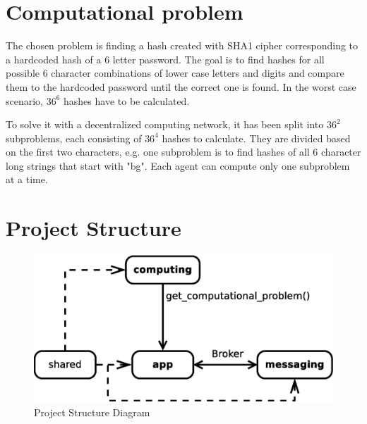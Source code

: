 \documentclass{article}
\begin{document}
\section{Computational problem}
The chosen problem is finding a hash created with SHA1 cipher corresponding to a hardcoded hash of a 6 letter password.
The goal is to find hashes for all possible 6 character combinations of lower case letters and digits and compare them to the hardcoded password until the correct one is found.
In the worst case scenario, $36^6$ hashes have to be calculated.

To solve it with a decentralized computing network, it has been split into $36^2$ subproblems,
each consisting of $36^4$ hashes to calculate. They are divided based on the first two characters,
e.g. one subproblem is to find hashes of all 6 character long strings that start with "bg".
Each agent can compute only one subproblem at a time.

\section{Project Structure}
\begin{figure}[H]
	\centering
	\includegraphics[width=\linewidth]{../diagrams/ProjectStructure.eps}
	\caption{Project Structure Diagram}
\end{figure}
\end{document}
